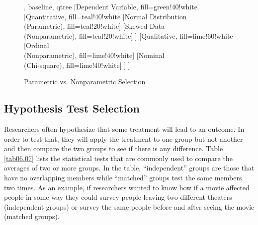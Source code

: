 \begin{figure}[H]
	\centering
	
	
	\begin{forest}, baseline, qtree
		[Dependent Variable, fill=green!40!white
		[{Quantitative}, fill=teal!40!white
		[{Normal Distribution\\(Parametric)}, fill=teal!20!white]
		[{Skewed Data\\(Nonparametric)}, fill=teal!20!white]
		]
		[{Qualitative}, fill=lime!60!white
		[{Ordinal\\(Nonparametric)}, fill=lime!40!white]
		[{Nominal\\(Chi-square)}, fill=lime!40!white]
		]
		]
	\end{forest}
	
	\caption{Parametric vs. Nonparametric Selection}
	\label{fig06.10}
\end{figure}

\subsection{Hypothesis Test Selection}

Researchers often hypothesize that some treatment will lead to an outcome. In order to test that, they will apply the treatment to one group but not another and then compare the two groups to see if there is any difference. Table \ref{tab06.07} lists the statistical tests that are commonly used to compare the averages of two or more groups. In the table, ``independent'' groups are those that have no overlapping members while ``matched'' groups test the same members two times. As an example, if researchers wanted to know how if a movie affected people in some way they could survey people leaving two different theaters (independent groups) or survey the same people before and after seeing the movie (matched groups).

